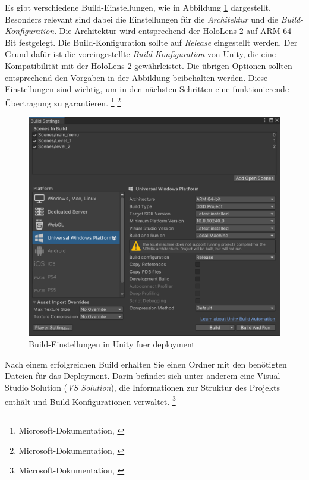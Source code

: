 Es gibt verschiedene Build-Einstellungen, wie in Abbildung \ref{fig:build-settings} dargestellt. Besonders relevant sind dabei die Einstellungen für die \textit{Architektur} und die \textit{Build-Konfiguration}. Die
Architektur wird entsprechend der HoloLens 2 auf ARM 64-Bit festgelegt. Die Build-Konfiguration sollte auf \textit{Release} eingestellt werden. Der Grund dafür ist die voreingestellte \textit{Build-Konfiguration} von
Unity, die eine Kompatibilität mit der HoloLens 2 gewährleistet. Die übrigen Optionen sollten entsprechend den Vorgaben in der Abbildung beibehalten werden. Diese Einstellungen sind wichtig, um in den nächsten Schritten
eine funktionierende Übertragung zu garantieren. \footnote{Microsoft-Dokumentation, \cite{Build-Tutorial}} \footnote{Microsoft-Dokumentation, \cite{Visual-Studio-Build-Settings}}

\begin{figure}[H]
    \centering
    \includegraphics[scale=0.6]{images/build}
    \caption{Build-Einstellungen in Unity fuer deployment}
    \label{fig:build-settings}
\end{figure}

Nach einem erfolgreichen Build erhalten Sie einen Ordner mit den benötigten Dateien für das Deployment. Darin befindet sich unter anderem eine Visual Studio Solution (\textit{VS Solution}), die Informationen zur Struktur des Projekts enthält und Build-Konfigurationen verwaltet. \footnote{Microsoft-Dokumentation, \cite{Visual Studio Solution}}

